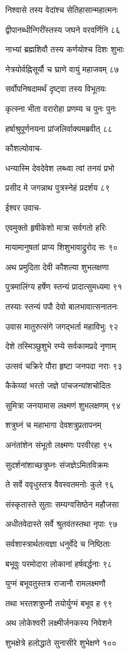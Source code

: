 निश्वासे तस्य वेदांश्च सेतिहासान्महात्मनः

द्वीपानब्धीन्गिरींस्तस्य जघने वरवर्णिनि ८६

नाभ्यां ब्रह्मशिवौ तस्य कर्णयोश्च दिशः शुभाः

नेत्रयोर्वह्निसूर्यौ च घ्राणे वायुं महाजवम् ८७

सर्वोपनिषदामर्थं दृष्ट्वा तस्य विभूतयः

कृत्स्ना भीता वरारोहा प्रणम्य च पुनः पुनः

हर्षाश्रुपूर्णनयना प्रांजलिर्वाक्यमब्रवीत् ८८

कौशल्योवाच-

धन्यास्मि देवदेवेश लब्ध्वा त्वां तनयं प्रभो

प्रसीद मे जगन्नाथ पुत्रस्नेहं प्रदर्शय ८९

ईश्वर उवाच-

एवमुक्तो हृषीकेशो मात्रा सर्वगतो हरिः

मायामानुषतां प्राप्य शिशुभावाद्रुरोद सः ९०

अथ प्रमुदिता देवी कौशल्या शुभलक्षणा

पुत्रमालिंग्य हर्षेण स्तन्यं प्रादात्सुमध्यमा ९१

तस्याः स्तन्यं पपौ देवो बालभावात्सनातनः

उवास मातुरुत्संगे जगद्भर्ता महाविभुः ९२

देशे तस्मिञ्छुशुभे रम्ये सर्वकामप्रदे नृणाम्

उत्सवं चक्रिरे पौरा हृष्टा जनपदा नराः ९३

कैकेय्यां भरतो जज्ञे पांचजन्यांशचोदितः

सुमित्रा जनयामास लक्ष्मणं शुभलक्षणम् ९४

शत्रुघ्नं च महाभागा देवशत्रुप्रतापनम्

अनंतांशेन संभूतो लक्ष्मणः परवीरहा ९५

सुदर्शनांशाच्छत्रुघ्नः संजज्ञेऽमितविक्रमः

ते सर्वे ववृधुस्तत्र वैवस्वतमनोः कुले ९६

संस्कृतास्ते सुताः सम्यग्वसिष्ठेन महौजसा

अधीतवेदास्ते सर्वे श्रुतवंतस्तथा नृपाः ९७

सर्वशास्त्रार्थतत्वज्ञा धनुर्वेदे च निष्ठिताः

बभूवुः परमोदारा लोकानां हर्षवर्द्धनाः ९८

युग्मं बभूवतुस्तत्र राजानौ रामलक्ष्मणौ

तथा भरतशत्रुघ्नौ तयोर्युग्मं बभूव ह ९९

अथ लोकेश्वरी लक्ष्मीर्जनकस्य निवेशने

शुभक्षेत्रे हलोद्धाते सुनासीरे शुभेक्षणे १००

